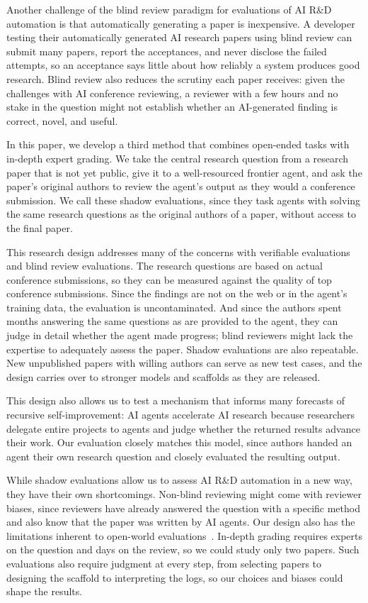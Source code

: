 Another challenge of the blind review paradigm for evaluations of AI R\&D automation is that automatically generating a paper is inexpensive. A developer testing their automatically generated AI research papers using blind review can submit many papers, report the acceptances, and never disclose the failed attempts, so an acceptance says little about how reliably a system produces good research. Blind review also reduces the scrutiny each paper receives: given the challenges with AI conference reviewing, a reviewer with a few hours and no stake in the question might not establish whether an AI-generated finding is correct, novel, and useful.


In this paper, we develop a third method that combines open-ended tasks with
in-depth expert grading. We take the central research question from a research
paper that is not yet public, give it to a well-resourced frontier agent, and
ask the paper's original authors to review the agent's output as they would a
conference submission. We call these shadow evaluations, since they task
agents with solving the same research questions as the original authors of a
paper, without access to the final paper.

This research design addresses many of the concerns with verifiable
evaluations and blind review evaluations. The research questions are based on
actual conference submissions, so they can be measured against the quality of
top conference submissions. Since the findings are not on the web or in the
agent's training data, the evaluation is uncontaminated. And since the authors
spent months answering the same questions as are provided to the agent, they
can judge in detail whether the agent made progress; blind reviewers might
lack the expertise to adequately assess the paper. Shadow evaluations are also repeatable. New
unpublished papers with willing authors can serve as new test cases, and the
design carries over to stronger models and scaffolds as they are released.

This design also allows us to test a mechanism that informs many forecasts of
recursive self-improvement: AI agents accelerate AI research because
researchers delegate entire projects to agents and judge whether the returned
results advance their work. Our evaluation closely matches this model, since
authors handed an agent their own research question and closely evaluated the
resulting output.

While shadow evaluations allow us to assess AI R\&D automation in a new way,
they have their own shortcomings. Non-blind reviewing might come with reviewer
biases, since reviewers have already answered the question with a specific
method and also know that the paper was written by AI agents. Our design also
has the limitations inherent to open-world evaluations~\citep{openworldevals}. In-depth grading
requires experts on the question and days on the review, so we could study
only two papers. Such evaluations also require judgment at every step, from
selecting papers to designing the scaffold to interpreting the logs, so our
choices and biases could shape the results.

